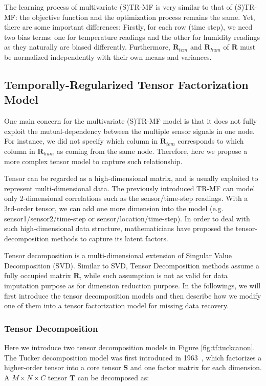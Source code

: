 The learning process of multivariate (S)TR-MF is very similar to that of (S)TR-MF: the objective function and the optimization process remains the same. Yet, there are some important differences: 
Firstly, for each row (time step), we need two bias terms: one for temperature readings and the other for humidity readings as they naturally are biased differently. Furthermore, $\mathbf{R}_{tem}$ and $\mathbf{R}_{hum}$ of $\mathbf{R}$ must be normalized independently with their own means and variances. 

 
\subsection{Temporally-Regularized Tensor Factorization Model} \label{sec:tensordecomp}

One main concern for the multivariate (S)TR-MF model is that it does not fully exploit the mutual-dependency between the multiple sensor signals in one node. For instance, we did not specify which column in $\mathbf{R}_{tem}$ corresponds to which column in $\mathbf{R}_{hum}$ as coming from the same node. Therefore, here we propose a more complex tensor model to capture such relationship. 

Tensor can be regarded as a high-dimensional matrix, and is usually exploited to represent multi-dimensional data. The previously introduced TR-MF can model only 2-dimensional correlations such as the sensor/time-step readings. With a 3rd-order tensor, we can add one more dimension into the model (e.g. sensor1/sensor2/time-step or sensor/location/time-step). In order to deal with such high-dimensional data structure, mathematicians have proposed the tensor-decomposition methods to capture its latent factors. 

Tensor decomposition is a multi-dimensional extension of Singular Value Decomposition (SVD). Similar to SVD, Tensor Decomposition methods assume a fully occupied matrix $\mathbf{R}$, while such assumption is not as valid for data imputation purpose as for dimension reduction purpose.
In the followings, we will first introduce the tensor decomposition models and then describe how we modify one of them into a tensor factorization model for missing data recovery. 

 
\subsubsection{Tensor Decomposition}
Here we introduce two tensor decomposition models in Figure \ref{fig:tf:tuckcanon}. The Tucker decomposition model was first introduced in 1963~\cite{tucker1963TF}, which factorizes a higher-order tensor into a core tensor $\mathbf{S}$ and one factor matrix for each dimension.
A $M\times N \times C $ tensor $\mathbf{T}$ can be decomposed as:

